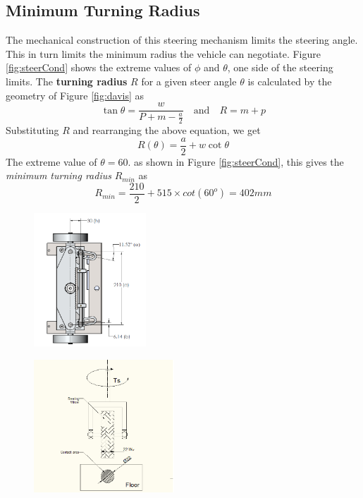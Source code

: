 \subsection{Minimum Turning Radius}
The mechanical construction of this steering mechanism limits the steering angle. This in turn limits the minimum radius the vehicle can negotiate.
Figure \ref{fig:steerCond} shows the extreme values of $\phi$ and $ \theta$, one side of the steering limits. The \textbf{ turning radius } $R$ for a given steer angle $\theta$  is calculated  by the geometry of Figure  \ref{fig:davis} as
\begin{equation*}
\tan\theta =\frac{w}{P+m-\frac{a}{2}} \quad \text{and} \quad R=m+p
\end{equation*}
Substituting $R$ and rearranging the above equation, we get 
\begin{equation}
\label{eqn:turningRadius}
R(\theta)=\frac{a}{2}+w\cot\theta
\end{equation}
The extreme value of $\theta=60.$ as shown in Figure \ref{fig:steerCond}, this gives the \textit{minimum turning radius } $R_{min}$ as
\begin{equation*}
R_{min}=\frac{210}{2}+515 \times cot(60^o)=402mm
\end{equation*}

\begin{figure}
	\centering
	\begin{minipage}{.5\textwidth}
		\centering
		\includegraphics[width=\linewidth,height=5cm,keepaspectratio]{Chapter3/fig/davis}
		\label{fig:davis}
	\end{minipage}%
	\begin{minipage}{.5\textwidth}
		\centering
		\includegraphics[width=\linewidth,height=5cm,keepaspectratio]{Chapter3/fig/steerTorqCal}
		\label{fig:steerTorq}
	\end{minipage}	
\end{figure} 

